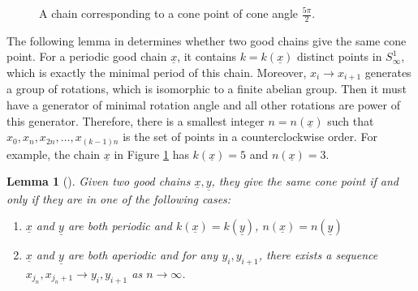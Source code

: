 \documentclass[reqno]{amsart}
\theoremstyle{plain}
\newtheorem{lemma}[thm]{Lemma}
\theoremstyle{definition}
\theoremstyle{remark}
\theoremstyle{definition}
\newcommand{\?}{\textcolor{red}{?}}
\begin{document}
\begin{figure}[h]
    \centering
    \caption{A chain corresponding to a cone point of cone angle $\frac{5\pi}{2}$.}
    \label{good chain}
\end{figure}

The following lemma in \cite[Lemma 4.4]{bankovic2018marked} determines whether two good chains give the same cone point. For a periodic good chain $\underline{x}$, it contains $k=k(\underline{x})$ distinct points in $S^1_\infty$, which is exactly the minimal period of this chain. Moreover, $x_i\to x_{i+1}$ generates a group of rotations, which is isomorphic to a finite abelian group. Then it must have a generator of minimal rotation angle and all other rotations are power of this generator. Therefore, there is a smallest integer $n=n(\underline{x})$ such that $x_0, x_n, x_{2n},\ldots, x_{(k-1)n}$ is the set of points in a counterclockwise order. For example, the chain $\underline{x}$ in Figure \ref{good chain} has $k(\underline{x})=5$ and $n(\underline{x})=3$.


\begin{lemma}[\cite{bankovic2018marked}]\label{interlaced}
Given two good chains $\underline{x},\underline{y}$, they give the same cone point if and only if they are in one of the following cases:
\begin{enumerate}
    \item[(1)] $\underline{x}$ and $\underline{y}$ are both periodic and $k(\underline{x})=k(\underline{y})$, $n(\underline{x})= n(\underline{y})$
    \item[(2)] $\underline{x}$ and $\underline{y}$ are both aperiodic and for any $y_i,y_{i+1}$, there exists a sequence $x_{j_n},x_{j_{n}+1}\to y_i,y_{i+1}$ as $n\to \infty$.
\end{enumerate}
\end{lemma}
\end{document}
